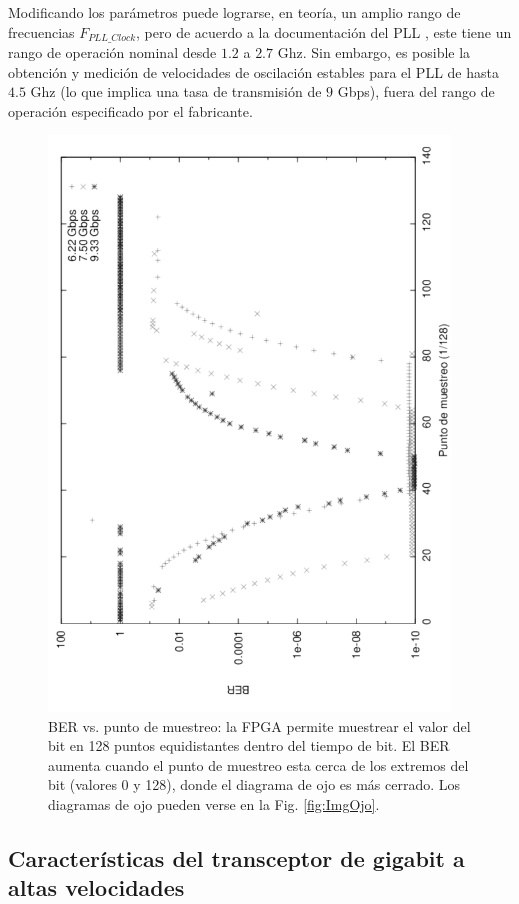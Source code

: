  Modificando los parámetros puede lograrse, en teoría, un amplio rango
de frecuencias $F_{PLL\_Clock}$, pero de acuerdo a la documentación
del PLL \cite[Pág. 71]{ug366}, este tiene un rango de operación nominal desde $1.2$ a
$2.7$ Ghz. Sin embargo, es posible \cite{OBGAH2010} la
obtención y medición de velocidades de oscilación estables para el PLL
de hasta $4.5$ Ghz (lo que implica una tasa de transmisión de $9$ Gbps),
fuera del rango de operación especificado por el fabricante.

\begin{figure}[t]
  \centering
    \includegraphics[width=4.2in,angle=270]{graphs/BER_sp_gray.pdf}
\caption {BER vs. punto de muestreo: la FPGA permite muestrear el valor del bit en 128 puntos equidistantes dentro del tiempo de bit. El BER aumenta cuando el punto de muestreo esta cerca de los extremos del bit (valores 0 y 128), donde el diagrama de ojo es más cerrado. Los diagramas de ojo pueden verse en la Fig. \ref{fig:ImgOjo}.}
\label{fig:BERvsSamplingPoint}
\end{figure}

\subsection{Características del transceptor de gigabit a altas velocidades}


